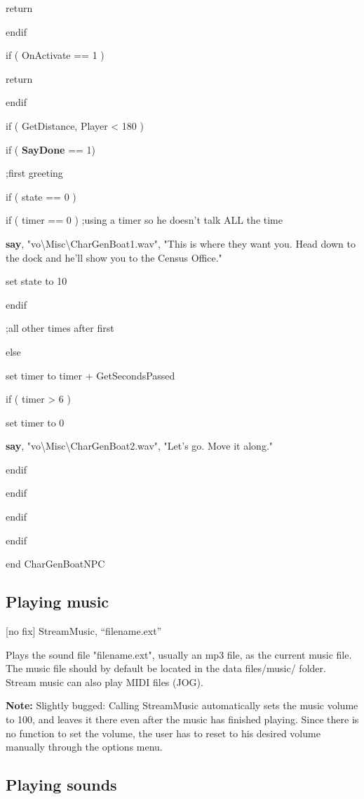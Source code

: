 \documentclass[
]{article}
\begin{document}
return

endif

if ( OnActivate == 1 )

return

endif

if ( GetDistance, Player \textless{} 180 )

if ( \textbf{SayDone} == 1)

;first greeting

if ( state == 0 )

if ( timer == 0 ) ;using a timer so he doesn't talk ALL the time

\textbf{say}, "vo\textbackslash Misc\textbackslash CharGenBoat1.wav",
"This is where they want you. Head down to the dock and he'll show you
to the Census Office."

set state to 10

endif

;all other times after first

else

set timer to timer + GetSecondsPassed

if ( timer \textgreater{} 6 )

set timer to 0

\textbf{say}, "vo\textbackslash Misc\textbackslash CharGenBoat2.wav",
"Let's go. Move it along."

endif

endif

endif

endif

end CharGenBoatNPC

\hypertarget{playing-music}{%
\subsection{Playing music}\label{playing-music}}

{[}no fix{]} StreamMusic, ``filename.ext''

Plays the sound file "filename.ext", usually an mp3 file, as the current
music file. The music file should by default be located in the data
files/music/ folder. Stream music can also play MIDI files (JOG).

\textbf{Note:} Slightly bugged: Calling StreamMusic automatically sets
the music volume to 100, and leaves it there even after the music has
finished playing. Since there is no function to set the volume, the user
has to reset to his desired volume manually through the options menu.

\hypertarget{playing-sounds}{%
\subsection{Playing sounds}\label{playing-sounds}}
\end{document}
